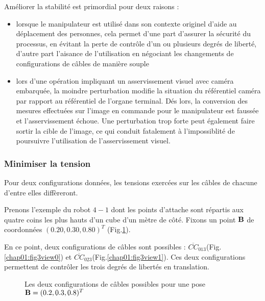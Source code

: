 Am\'eliorer la stabilit\'e est primordial pour deux raisons :
\begin{itemize}
 \item lorsque le manipulateur est utilis\'e dans son contexte originel d'aide 
au d\'eplacement des personnes, cela permet d'une part d'assurer la 
s\'ecurit\'e du processus, en \'evitant la perte de contr\^ole d'un ou 
plusieurs degr\'es de libert\'e, d'autre part l'aisance de l'utilisation en 
n\'egociant les changements de configurations de c\^ables de mani\`ere souple
\item lors d'une op\'eration impliquant un asservissement visuel avec cam\'era 
embarqu\'ee, la moindre perturbation modifie la situation du r\'ef\'erentiel 
cam\'era par rapport au r\'ef\'erentiel de l'organe terminal. D\'es lors, la 
conversion des mesures effectu\'ees sur l'image en commande pour le 
manipulateur est fauss\'ee et l'asservissement \'echoue. Une perturbation trop 
forte peut \'egalement faire sortir la cible de l'image, ce qui conduit 
fatalement \`a l'impossiblit\'e de poursuivre l'utilisation de l'asservissement 
visuel.
\end{itemize} 


\subsubsection{Minimiser la tension}

Pour deux configurations donn\'ees, les tensions exerc\'ees sur les c\^ables de 
chacune d'entre elles diff\`ereront.

Prenons l'exemple du robot $4-1$ dont les points d'attache sont r\'epartis aux 
quatre coins les plus hauts d'un cube d'un m\`etre de c\^ot\'e. Fixons un point 
${\bf B}$ de coordonn\'ees $(0.20, 0.30, 0.80)^T$ (Fig.\ref{chap01:fig3}).

En ce point, deux configurations de c\^ables sont possibles : 
$\overline{CC}_{013}$(Fig.\ref{chap01:fig3view0}) et $\overline{CC}_{023}$(Fig.\ref{chap01:fig3view1}). Ces deux configurations 
permettent de contr\^oler les trois degr\'es de libert\'es en translation.

\begin{figure}[htp]
  \centering
  \hfill
    \caption{\footnotesize{Les deux configurations de c\^ables possibles pour 
une pose ${\bf B} = (0.2, 0.3, 0.8)^T$}}
\label{chap01:fig3}
\end{figure}


